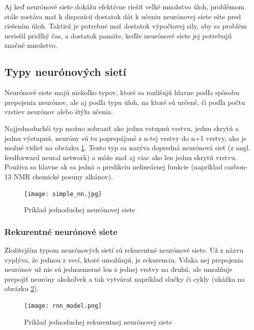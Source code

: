 Aj keď neurónové siete dokážu efektívne riešiť veľké množstvo úloh, problémom stále zostáva mať k dispozícii dostatok dát k učeniu neurónovej siete ešte pred riešením úloh. Taktiež je potrebné mať dostatok výpočtovej sily, aby sa problém neriešil pridlhý čas, a dostatok pamäte, keďže neurónové siete jej potrebujú značné množstvo. 	
	 
	
\subsection{Typy neurónových sietí}

Neurónové siete majú niekoľko typov, ktoré  sa rozlišujú hlavne podľa spôsobu prepojenia neurónov, ale aj podľa typu úloh, na ktoré sú určené, či podľa počtu vrstiev neurónov alebo štýlu učenia. %
	
	
Najjednoduchší typ možno zobraziť ako jednu vstupnú vrstvu, jednu skrytú a jednu výstupnú, neuróny sú tu poprepájané z n-tej vrstvy do n+1 vrstvy, ako je možné vidieť na obrázku \ref{simple_nn}. Tento typ sa nazýva dopredná neurónová sieť (z angl. feedforward neural network) a môže mať aj viac ako len jednu skrytú vrstvu. Používa sa hlavne ak sa jedná  o predikciu nelineárnej funkcie (napríklad carbon-13 NMR chemické posuny alkánov\cite{feedforward}). 
	\begin{figure}[H]
		\begin{center}\texttt{[image: simple\_nn.jpg]}\end{center}
		\caption[Jednoduchá neurónová sieť]{Príklad jednoduchej neurónovej siete}\label{simple_nn}
	\end{figure}

\subsubsection{Rekurentné neurónové siete}
Zložitejším typom  neurónových sietí sú rekurentné neurónové siete. Už z názvu vyplýva, že jednou z vecí, ktoré umožňujú, je rekurenciu. Vďaka nej prepojenia neurónov už nie sú jednosmerné len z jednej vrstvy na druhú, ale umožňuje prepojiť neuróny akokoľvek a tak vytvárať napríklad slučky či cykly (ukážka na obrázku \ref{rnn_image}).

\begin{figure}[H]
	\begin{center}\texttt{[image: rnn\_model.png]}\end{center}
	\caption[Jednoduchá rekurentná neurónová sieť]{Príklad jednoduchej rekurentnej neurónovej siete\label{rnn_image}\footnotemark}
	
\end{figure}

